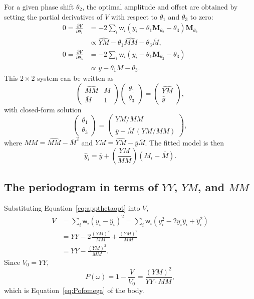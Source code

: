 \documentclass[apj]{emulateapj}
\newcommand{\wgt}{\mathsf{w}}  %
\newcommand{\Mshft}{\mathbf{M}_{\theta_2}}
\newcommand{\MMhat}{\widehat{MM}}
\newcommand{\YMhat}{\widehat{YM}}
\newcommand{\Mbar}{\overline{M}}
\begin{document}
\begin{appendix}
For a given phase shift $\theta_2$, the optimal amplitude and offset
are obtained by setting the partial derivatives of $V$ with respect
to $\theta_1$ and $\theta_3$ to zero:
\begin{align}
0 = \frac{\partial V}{\partial\theta_1} &= -2\sum_i \wgt_i(y_i - \theta_1\Mshft - \theta_3)\Mshft \nonumber \\
   &\propto \YMhat - \theta_1 \MMhat - \theta_3 \Mbar,\\
0 = \frac{\partial V}{\partial\theta_3} &= -2\sum_i \wgt_i(y_i - \theta_1\Mshft - \theta_3) \nonumber \\
   &\propto \bar{y} - \theta_1 \Mbar - \theta_3.
\end{align}
This $2\!\times\!2$ system can be written as
\begin{equation}
\begin{pmatrix} \MMhat & \Mbar \\ \Mbar & 1 \end{pmatrix}
\begin{pmatrix} \theta_1 \\ \theta_3 \end{pmatrix}
=
\begin{pmatrix} \YMhat \\ \bar{y}\end{pmatrix},
\end{equation}
with closed-form solution
\begin{equation}\label{eq:appthetaopt}
\begin{pmatrix} \theta_1 \\ \theta_3 \end{pmatrix}
=
\begin{pmatrix} YM / MM \\ \bar{y} - \Mbar\,(YM / MM)\end{pmatrix},
\end{equation}
where $MM = \MMhat - \Mbar^2$ and
$YM = \YMhat - \bar{y}\Mbar$.  The fitted model is then
\begin{equation}
\hat{y}_i = \bar{y} + \left(\frac{YM}{MM}\right)\!\left(M_i - \Mbar\right).
\end{equation}

\subsection{The periodogram in terms of $YY$, $YM$, and $MM$}
\label{app:periodogramform}

Substituting Equation~\ref{eq:appthetaopt} into $V$,
\begin{align}
V &= \sum_i \wgt_i (y_i - \hat{y}_i)^2 = \sum_i \wgt_i (y_i^2 - 2y_i\hat{y}_i + \hat{y}_i^2) \nonumber\\
  &= YY - 2\frac{(YM)^2}{MM} + \frac{(YM)^2}{MM} \nonumber\\
  &= YY - \frac{(YM)^2}{MM}.
\end{align}
Since $V_0 = YY$,
\begin{equation}
P(\omega) = 1 - \frac{V}{V_0} = \frac{(YM)^2}{YY\cdot MM},
\end{equation}
which is Equation~\ref{eq:Pofomega} of the body.


\end{appendix}
\end{document}
